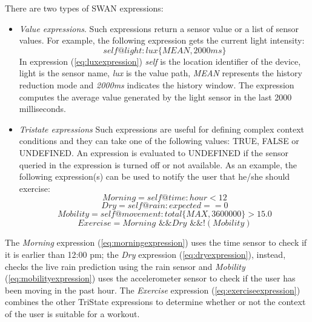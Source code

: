 There are two types of SWAN expressions:
\begin{itemize}
\item \emph{Value expressions}. Such expressions return a sensor value or a list of sensor
values. For example, the following expression gets the current light intensity:
\begin{equation} \label{eq:luxexpression}
self@light:lux\big\{MEAN, 2000ms\big\}
\end{equation}
In expression (\ref{eq:luxexpression}) \emph{self} is the location identifier of the device, light
is the sensor name, \emph{lux} is the value path, \emph{MEAN} represents the history reduction mode and \emph{2000ms} indicates the history window. The expression computes the average value generated by the light sensor in the last 2000 milliseconds.

\item \emph{Tristate expressions} Such expressions are useful for defining complex context conditions and they can take one of the following values: TRUE, FALSE or UNDEFINED. An expression is evaluated to UNDEFINED if the sensor queried in the expression is turned off or not available. As an example, the following expression(s) can be used to notify the user that he/she should exercise:
\begin{equation} \label{eq:morningexpression}
Morning = self@time:hour < 12 
\end{equation}
\begin{equation} \label{eq:dryexpression}
Dry = self@rain:expected == 0 
\end{equation}
\begin{equation} \label{eq:mobilityexpression}
Mobility = self@movement:total \big\{MAX,3600000\big\} > 15.0
\end{equation}
\begin{equation} \label{eq:exerciseexpression}
Exercise = Morning \text{ \&\& } Dry \text{ \&\& }  \text{!} (Mobility)
\end{equation}
\end{itemize}
The \emph{Morning} expression (\ref{eq:morningexpression}) uses the time sensor to
check if it is earlier than 12:00 pm; the \emph{Dry} expression (\ref{eq:dryexpression}), instead, checks the live rain prediction using the rain sensor and \emph{Mobility} (\ref{eq:mobilityexpression}) uses the accelerometer sensor to check if the user has been moving in the past hour. The \emph{Exercise} expression (\ref{eq:exerciseexpression}) combines the other TriState expressions to determine whether or not the context of the user is suitable for a workout.

